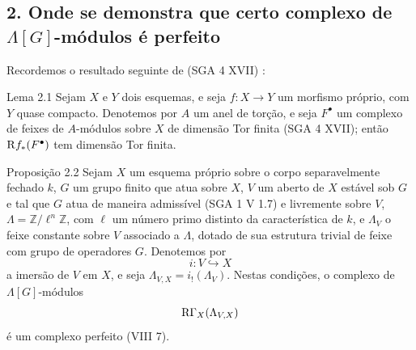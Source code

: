 \subsection*{2. Onde se demonstra que certo complexo de $\Lambda[G]$-módulos é perfeito}

Recordemos o resultado seguinte de (SGA 4 XVII) :

\begin{statement}{Lema 2.1}
Sejam $X$ e $Y$ dois esquemas, e seja $f:X\to Y$ um morfismo próprio, com $Y$ quase compacto. Denotemos por $A$ um anel de torção, e seja $F^\bullet$ um complexo de feixes de $A$-módulos sobre $X$ de dimensão Tor finita (SGA 4 XVII); então $\mathrm{R} f_*(F^\bullet)$ tem dimensão Tor finita.
\end{statement}

\begin{statement}{Proposição 2.2}
Sejam $X$ um esquema próprio sobre o corpo separavelmente fechado $k$, $G$ um grupo finito que atua sobre $X$, $V$ um aberto de $X$ estável sob $G$ e tal que $G$ atua de maneira admissível (SGA 1 V 1.7) e livremente sobre $V$, $\Lambda=\mathbb Z/\ell^n\mathbb Z$, com $\ell$ um número primo distinto da característica de $k$, e $\Lambda_V$ o feixe constante sobre $V$ associado a $\Lambda$, dotado de sua estrutura trivial de feixe com grupo de operadores $G$. Denotemos por
\[
i:V\hookrightarrow X
\]
a imersão de $V$ em $X$, e seja $\Lambda_{V,X}=i_!(\Lambda_V)$. Nestas condições, o complexo de $\Lambda[G]$-módulos
\[
\mathrm{R}\Gamma_X(\Lambda_{V,X})
\]
é um complexo perfeito (VIII 7).
\end{statement}
